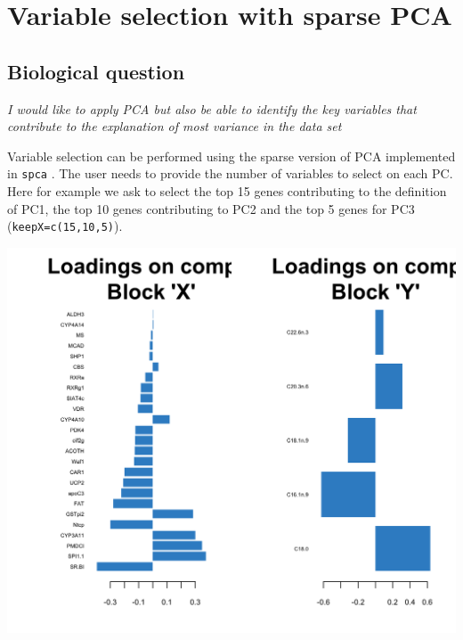 \documentclass[]{book}
\newenvironment{Shaded}{\begin{snugshade}}{\end{snugshade}}
\newcommand{\KeywordTok}[1]{\textcolor[rgb]{0.13,0.29,0.53}{\textbf{#1}}}
\newcommand{\DataTypeTok}[1]{\textcolor[rgb]{0.13,0.29,0.53}{#1}}
\newcommand{\DecValTok}[1]{\textcolor[rgb]{0.00,0.00,0.81}{#1}}
\newcommand{\StringTok}[1]{\textcolor[rgb]{0.31,0.60,0.02}{#1}}
\newcommand{\CommentTok}[1]{\textcolor[rgb]{0.56,0.35,0.01}{\textit{#1}}}
\newcommand{\OtherTok}[1]{\textcolor[rgb]{0.56,0.35,0.01}{#1}}
\newcommand{\OperatorTok}[1]{\textcolor[rgb]{0.81,0.36,0.00}{\textbf{#1}}}
\newcommand{\NormalTok}[1]{#1}
\theoremstyle{definition}
\theoremstyle{definition}
\theoremstyle{definition}
\theoremstyle{remark}
\begin{document}
\section{Variable selection with sparse PCA}\label{sPCA}

\subsection{Biological question}\label{biological-question-1}

{ \emph{I would like to apply PCA but also be able to identify the key
variables that contribute to the explanation of most variance in the
data set} }

Variable selection can be performed using the sparse version of PCA
implemented in \texttt{spca} \citep{She08}. The user needs to provide
the number of variables to select on each PC. Here for example we ask to
select the top 15 genes contributing to the definition of PC1, the top
10 genes contributing to PC2 and the top 5 genes for PC3
(\texttt{keepX=c(15,10,5)}).

\begin{Shaded}
\end{Shaded}

\begin{center}\includegraphics[width=0.5\linewidth]{Figures/unnamed-chunk-10-1} \end{center}
\end{document}
